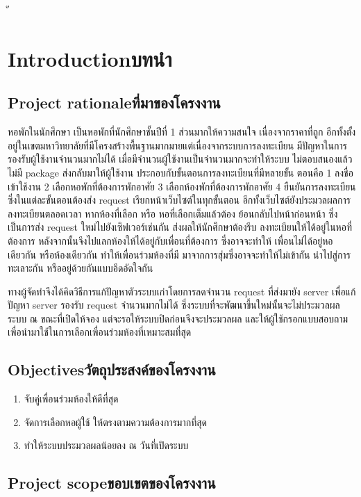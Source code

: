 ั\chapter{\ifenglish Introduction\else บทนำ\fi}

\section{\ifenglish Project rationale\else ที่มาของโครงงาน\fi}

หอพักในนักศึกษา เป็นหอพักที่นักศึกษาชั้นปีที่ 1 ส่วนมากให้ความสนใจ เนื่องจากราคาที่ถูก 
อีกทั้งตั้งอยู่ในเขตมหาวิทยาลัยที่มีโครงสร้างพื้นฐานมากมายแต่เนื่องจากระบบการลงทะเบียน
มีปัญหาในการรองรับผู้ใช้งานจำนวนมากไม่ได้ เมื่อมีจำนวนผู้ใช้งานเป็นจำนวนมากจะทำให้ระบบ
ไม่ตอบสนองแล้วไม่มี package ส่งกลับมาให้ผู้ใช้งาน ประกอบกับขั้นตอนการลงทะเบียนที่มีหลายขั้น
ตอนคือ 1 ลงชื่อเข้าใช้งาน 2 เลือกหอพักที่ต้องการพักอาศัย 3 เลือกห้องพักที่ต้องการพักอาศัย 
4 ยืนยันการลงทะเบียน ซึ่งในแต่ละขั้นตอนต้องส่ง request เรียกหน้าเว็บไซต์ในทุกขั้นตอน 
อีกทั้งเว็บไซต์ยังประมวลผลการลงทะเบียนตลอดเวลา หากห้องที่เลือก หรือ หอที่เลือกเต็มแล้วต้อง
ย้อนกลับไปหน้าก่อนหน้า ซึ่งเป็นการส่ง request ใหม่ไปยังเซิฟเวอร์เช่นกัน ส่งผลให้นักศึกษาต้องรีบ
ลงทะเบียนให้ได้อยู่ในหอที่ต้องการ หลังจากนั้นจึงไปแลกห้องให้ได้อยู่กับเพื่อนที่ต้องการ ซึ่งอาจจะทำให้
เพื่อนไม่ได้อยู่หอเดียวกัน หรือห้องเดียวกัน ทำให้เพื่อนร่วมห้องที่มี มาจากการสุ่มซึ่งอาจจะทำให้ไม่เข้ากัน
นำไปสู่การทะเลาะกัน หรืออยู่ด้วยกันแบบอึดอัดใจกัน

ทางผู้จัดทำจึงได้คิดวิธีการแก้ปัญหาตัวระบบเก่าโดยการลดจำนวน request ที่ส่งมายัง server เพื่อแก้ปัญหา 
server รองรับ request จำนวนมากไม่ได้ ซึ่งระบบที่จะพัฒนาขึ้นใหม่นั้นจะไม่ประมวลผลระบบ ณ ขณะที่เปิดให้จอง
แต่จะรอให้ระบบปิดก่อนจึงจะประมวลผล และให้ผู้ใช้กรอกแบบสอบถามเพื่อนำมาใช้ในการเลือกเพื่อนร่วมห้องที่เหมาะสมที่สุด

\section{\ifenglish Objectives\else วัตถุประสงค์ของโครงงาน\fi}
\begin{enumerate}
    \item จับคู่เพื่อนร่วมห้องให้ดีที่สุด
    \item จัดการเลือกหอผู้ใช้ ให้ตรงตามความต้องการมากที่สุด
    \item ทำให้ระบบประมวลผลน้อยลง ณ วันที่เปิดระบบ
\end{enumerate}

\section{\ifenglish Project scope\else ขอบเขตของโครงงาน\fi}
